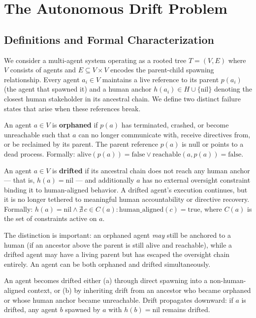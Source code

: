 \section{The Autonomous Drift Problem}

\subsection{Definitions and Formal Characterization}

We consider a multi-agent system operating as a rooted tree $T = (V, E)$ where $V$ consists of agents and $E \subseteq V \times V$ encodes the parent-child spawning relationship. Every agent $a_i \in V$ maintains a live reference to its parent $p(a_i)$ (the agent that spawned it) and a human anchor $h(a_i) \in H \cup \{\text{nil}\}$ denoting the closest human stakeholder in its ancestral chain. We define two distinct failure states that arise when these references break.

\begin{definition}
An agent $a \in V$ is \textbf{orphaned} if $p(a)$ has terminated, crashed, or become unreachable such that $a$ can no longer communicate with, receive directives from, or be reclaimed by its parent. The parent reference $p(a)$ is null or points to a dead process. Formally: $\text{alive}(p(a)) = \text{false} \lor \text{reachable}(a, p(a)) = \text{false}$.
\end{definition}

\begin{definition}
An agent $a \in V$ is \textbf{drifted} if its ancestral chain does not reach any human anchor --- that is, $h(a) = \text{nil}$ --- and additionally $a$ has no external oversight constraint binding it to human-aligned behavior. A drifted agent's execution continues, but it is no longer tethered to meaningful human accountability or directive recovery. Formally: $h(a) = \text{nil} \land \nexists\, c \in C(a) : \text{human\_aligned}(c) = \text{true}$, where $C(a)$ is the set of constraints active on $a$.
\end{definition}

The distinction is important: an orphaned agent \emph{may} still be anchored to a human (if an ancestor above the parent is still alive and reachable), while a drifted agent may have a living parent but has escaped the oversight chain entirely. An agent can be both orphaned and drifted simultaneously.

\begin{property}
An agent becomes drifted either (a) through direct spawning into a non-human-aligned context, or (b) by inheriting drift from an ancestor who became orphaned or whose human anchor became unreachable. Drift propagates downward: if $a$ is drifted, any agent $b$ spawned by $a$ with $h(b) = \text{nil}$ remains drifted.
\end{property}

